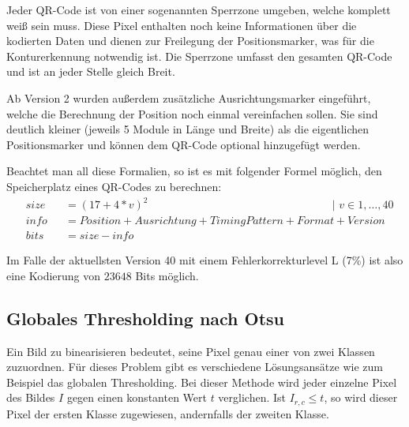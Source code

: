 \documentclass[a4paper, oneside, 12pt]{article}
\begin{document}
Jeder QR-Code ist von einer sogenannten Sperrzone umgeben, welche komplett weiß sein muss. Diese Pixel enthalten noch keine Informationen über die kodierten Daten und dienen zur Freilegung der Positionsmarker, was für die Konturerkennung notwendig ist. Die Sperrzone umfasst den gesamten QR-Code und ist an jeder Stelle gleich Breit.

Ab Version 2 wurden außerdem zusätzliche Ausrichtungsmarker eingeführt, welche die Berechnung der Position noch einmal vereinfachen sollen. Sie sind deutlich kleiner (jeweils 5 Module in Länge und Breite) als die eigentlichen Positionsmarker und können dem QR-Code optional hinzugefügt werden.

Beachtet man all diese Formalien, so ist es mit folgender Formel möglich, den Speicherplatz eines QR-Codes zu berechnen:
\begin{align*}
&size &&= (17 + 4 * v)^2 \hspace{200pt} | \,\, v \in 1,\dots,40\\
&info &&= Position + Ausrichtung + TimingPattern + Format + Version\\
&bits &&= size - info
\end{align*}

Im Falle der aktuellsten Version 40 mit einem Fehlerkorrekturlevel L (7\%) ist also eine Kodierung von $23648$ Bits möglich.



\subsection{Globales Thresholding nach Otsu}
\label{ss:otsu}

Ein Bild zu binearisieren bedeutet, seine Pixel genau einer von zwei Klassen zuzuordnen. Für dieses Problem gibt es verschiedene Lösungsansätze wie zum Beispiel das globalen Thresholding. Bei dieser Methode wird jeder einzelne Pixel des Bildes $I$ gegen einen konstanten Wert $t$ verglichen. Ist $I_{r,c} \leq t$, so wird dieser Pixel der ersten Klasse zugewiesen, andernfalls der zweiten Klasse.
\end{document}
